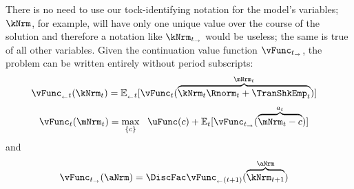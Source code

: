 \documentclass[titlepage, headings=optiontotocandhead]{Resources/texmf-local/tex/latex/econtex}
\begin{document}
There is no need to use our {tock}-identifying notation for the model's variables; $\kNrm$, for example, will have only one unique value over the course of the solution and therefore a notation like $\kNrm_{t_\rightarrow}$ would be useless; the same is true of all other variables.  Given the continuation value function $\vFunc_{t_\rightarrow}$, the problem can be written entirely without {period} subscripts:
  \begin{equation}\begin{gathered}\begin{aligned}
        \vFunc_{_\leftarrow t}(\kNrm_{t}) & = \Ex_{_\leftarrow t}[\vFunc_{{t}}(\overbrace{\kNrm_{t} \Rnorm_{t} + \TranShkEmp_{t}}^{\mNrm_{t}})]  \label{eq:vBeg}
      \end{aligned}\end{gathered}\end{equation}
  \begin{equation}\begin{gathered}\begin{aligned}
        \vFunc_{{t}}(\mNrm_{t}) & = \max_{\{{c}\}}~~\uFunc({c}) +\Ex_{{t}}[ \vFunc_{t_\rightarrow}(\overbrace{\mNrm_{t}-{c}}^{a_{t}})] \label{eq:vMid}
      \end{aligned}\end{gathered}\end{equation}
and
  \begin{equation}\begin{gathered}\begin{aligned}
        \vFunc_{t_\rightarrow}(\aNrm) & = \DiscFac \vFunc_{_\leftarrow{(t+1)}}(\overbrace{\kNrm_{t+1}}^{\aNrm}) \label{eq:vEndtdefn}
      \end{aligned}\end{gathered}\end{equation}
\end{document}
